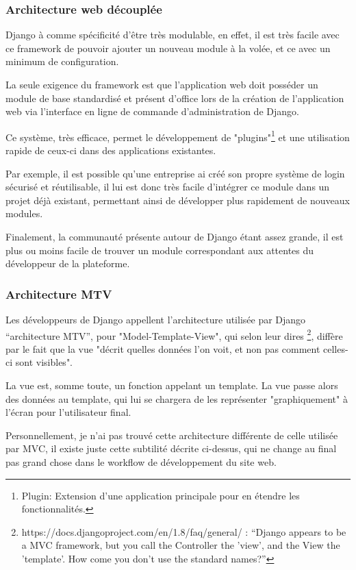 \documentclass[12pt,table,a4paper]{report}
\begin{document}
\subsubsection{Architecture web découplée}
Django à comme spécificité d'être très modulable, en effet, il est très facile avec ce framework de pouvoir ajouter un nouveau module à la volée, et ce avec un minimum de configuration.

La seule exigence du framework est que l'application web doit posséder un module de base standardisé et présent d'office lors de la création de l'application web via l'interface en ligne de commande d'administration de Django.

Ce système, très efficace, permet le développement de "plugins"\footnote{Plugin: Extension d'une application principale pour en étendre les fonctionnalités.} et une utilisation rapide de ceux-ci dans des applications existantes.

Par exemple, il est possible qu'une entreprise ai créé son propre système de login sécurisé et réutilisable, il lui est donc très facile d'intégrer ce module dans un projet déjà existant, permettant ainsi de développer plus rapidement de nouveaux modules.

Finalement, la communauté présente autour de Django étant assez grande, il est plus ou moins facile de trouver un module correspondant aux attentes du développeur de la plateforme.

\subsubsection{Architecture MTV}
Les développeurs de Django appellent l'architecture utilisée par Django "`architecture MTV"', pour "Model-Template-View", qui selon leur dires \footnote{https://docs.djangoproject.com/en/1.8/faq/general/ : "`Django appears to be a MVC framework, but you call the Controller the 'view', and the View the 'template'. How come you don’t use the standard names?"'}, diffère par le fait que la vue "décrit quelles données l'on voit, et non pas comment celles-ci sont visibles".

La vue est, somme toute, un fonction appelant un template. La vue passe alors des données au template, qui lui se chargera de les représenter "graphiquement" à l'écran pour l'utilisateur final.

Personnellement, je n'ai pas trouvé cette architecture différente de celle utilisée par MVC, il existe juste cette subtilité décrite ci-dessus, qui ne change au final pas grand chose dans le workflow de développement du site web.
\end{document}
